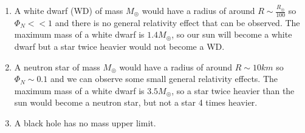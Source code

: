 \documentclass[a4paper]{book}
\theoremstyle{definition}
\theoremstyle{remark}
\begin{document}
\begin{enumerate}
    \item A white dwarf (WD) of mass $M_\circledcirc$ would have a radius of around $R \sim \frac{R_\circledcirc}{100}$ so $\Phi_N <<1$ and there is no general relativity effect that can be observed. The maximum mass of a white dwarf is $1.4 M_{\circledcirc}$, so our sun will become a white dwarf but a star twice heavier would not become a WD.
    \item A neutron star of mass $M_\circledcirc$ would have a radius of around $R \sim 10km$ so $\Phi_N \sim 0.1$ and we can observe some small general relativity effects. The maximum mass of a white dwarf is $3.5 M_{\circledcirc}$, so a star twice heavier than the sun would become a neutron star, but not a star 4 times heavier. 
    \item A black hole has no mass upper limit. 
\end{enumerate} \medskip 
\end{document}
